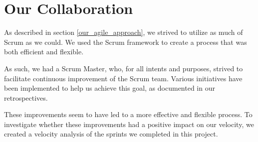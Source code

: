 \section{Our Collaboration}
As described in section \ref{our_agile_approach}, we strived to utilize as much of Scrum as we could. We used the Scrum framework to create a process that was both efficient and flexible. 

As such, we had a Scrum Master, who, for all intents and purposes, strived to facilitate continuous improvement of the Scrum team. Various initiatives have been implemented to help us achieve this goal, as documented in our retrospectives.

These improvements seem to have led to a more effective and flexible process. To investigate whether these improvements had a positive impact on our velocity, we created a velocity analysis of the sprints we completed in this project.

